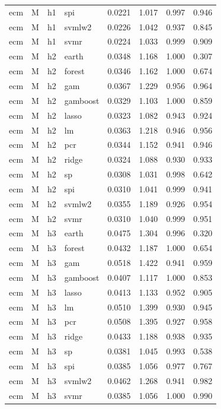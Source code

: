 \begin{ThreePartTable}
\begin{longtable}[t]{llclcccc}
ecm & M & h1 & spi & 0.0221 & 1.017 & 0.997 & 0.946\\
ecm & M & h1 & svmlw2 & 0.0226 & 1.042 & 0.937 & 0.845\\
ecm & M & h1 & svmr & 0.0224 & 1.033 & 0.999 & 0.909\\
\addlinespace
ecm & M & h2 & earth & 0.0348 & 1.168 & 1.000 & 0.307\\
ecm & M & h2 & forest & 0.0346 & 1.162 & 1.000 & 0.674\\
ecm & M & h2 & gam & 0.0367 & 1.229 & 0.956 & 0.964\\
ecm & M & h2 & gamboost & 0.0329 & 1.103 & 1.000 & 0.859\\
ecm & M & h2 & lasso & 0.0323 & 1.082 & 0.943 & 0.924\\
ecm & M & h2 & lm & 0.0363 & 1.218 & 0.946 & 0.956\\
ecm & M & h2 & pcr & 0.0344 & 1.152 & 0.941 & 0.946\\
ecm & M & h2 & ridge & 0.0324 & 1.088 & 0.930 & 0.933\\
ecm & M & h2 & sp & 0.0308 & 1.031 & 0.998 & 0.642\\
ecm & M & h2 & spi & 0.0310 & 1.041 & 0.999 & 0.941\\
ecm & M & h2 & svmlw2 & 0.0355 & 1.189 & 0.926 & 0.954\\
ecm & M & h2 & svmr & 0.0310 & 1.040 & 0.999 & 0.951\\
\addlinespace
ecm & M & h3 & earth & 0.0475 & 1.304 & 0.996 & 0.320\\
ecm & M & h3 & forest & 0.0432 & 1.187 & 1.000 & 0.654\\
ecm & M & h3 & gam & 0.0518 & 1.422 & 0.941 & 0.959\\
ecm & M & h3 & gamboost & 0.0407 & 1.117 & 1.000 & 0.853\\
ecm & M & h3 & lasso & 0.0413 & 1.133 & 0.952 & 0.905\\
ecm & M & h3 & lm & 0.0510 & 1.399 & 0.930 & 0.945\\
ecm & M & h3 & pcr & 0.0508 & 1.395 & 0.927 & 0.958\\
ecm & M & h3 & ridge & 0.0433 & 1.188 & 0.938 & 0.935\\
ecm & M & h3 & sp & 0.0381 & 1.045 & 0.993 & 0.538\\
ecm & M & h3 & spi & 0.0385 & 1.056 & 0.977 & 0.767\\
ecm & M & h3 & svmlw2 & 0.0462 & 1.268 & 0.941 & 0.982\\
ecm & M & h3 & svmr & 0.0385 & 1.056 & 1.000 & 0.990\\

\end{longtable}
\end{ThreePartTable}
